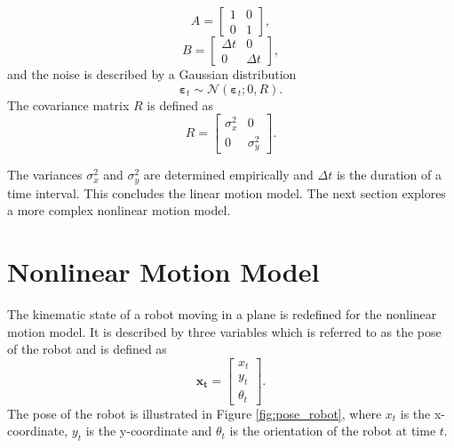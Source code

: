 \documentclass[12pt,oneside,openany,a4paper, %
afrikaans,english,
]{memoir}
\numberwithin{equation}{chapter}
\begin{document}
{\begin{equation}
A =
\begin{bmatrix}
1 & 0\\
0 & 1
\end{bmatrix},
\end{equation}
\begin{equation}
B = \begin{bmatrix}
\Delta t & 0\\
0 & \Delta t
\end{bmatrix},
\end{equation}
and the noise is described by a Gaussian distribution
\begin{equation}
\bm{\varepsilon}_t \sim \mathcal{N}(\bm{\varepsilon}_t; 0, R).
\end{equation}
The covariance matrix $R$ is defined as
\begin{equation}
R = 
\begin{bmatrix}
\sigma_x^2 & 0\\
0 & \sigma_y^2
\end{bmatrix}.
\end{equation}

The variances $\sigma_x^2$ and $\sigma_y^2$ are determined empirically and $\Delta t$ is the duration of a time interval.
This concludes the linear motion model. The next section explores a more complex nonlinear motion model.

\section{Nonlinear Motion Model}\label{vmodel}
The kinematic state of a robot moving in a plane is redefined for the nonlinear motion model. It is described by three variables which is referred to as the pose of the robot and is defined as
\begin{equation}
\bm{x_t} =
\begin{bmatrix}
x_t\\
y_t\\
\theta_t
\end{bmatrix}.
\end{equation}
The pose of the robot is illustrated in Figure \ref{fig:pose_robot}, where $x_t$ is the x-coordinate, $y_t$ is the y-coordinate and $\theta_t$ is the orientation of the robot at time $t$.

}
\end{document}
